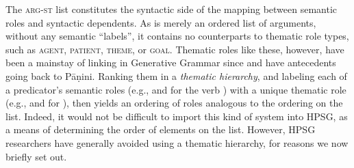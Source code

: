 \documentclass[output=paper,biblatex,babelshorthands,newtxmath,draftmode,colorlinks, citecolor=brown]{langscibook}
\begin{document}
The \textsc{arg-st} list constitutes the syntactic side of the mapping between semantic roles and
syntactic dependents.  As \argst is merely an ordered list of arguments, without any semantic
``labels'', it contains no counterparts to thematic role types, such as \textsc{agent},
\textsc{patient}, \textsc{theme}, or \textsc{goal}.  Thematic roles like these, however, have been a
mainstay of linking in Generative Grammar since \citet{Fillmore1968} and have antecedents going back
to P\={a}\d{n}ini. 
Ranking them in a \emph{thematic hierarchy}, and labeling each of a
predicator's semantic roles (e.g.,  and  for the verb ) with a
unique thematic role (e.g.,  and  for ), then yields an
ordering of roles analogous to the ordering on the \argst list.  Indeed, it would not be difficult
to import this kind of system into HPSG, as a means of determining the order of elements on the
\argst list.  However, HPSG researchers have generally avoided using a thematic hierarchy, for
reasons we now briefly set out. 
\end{document}

